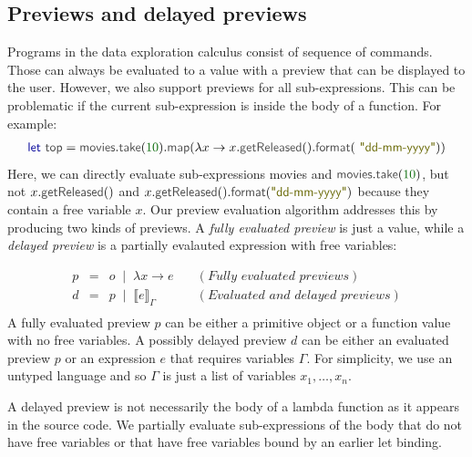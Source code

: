 \documentclass[acmsmall,anonymous,fleqn]{acmart}\settopmatter{printfolios=false,printccs=false,printacmref=false}
\theoremstyle{plain}
\theoremstyle{definition}
\newcommand{\lsep}{\;\;|\;\;}
\newcommand{\num}[1]{\textcolor{numclr}{#1}}
\newcommand{\str}[1]{\textnormal{\textcolor{strclr}{\sffamily "#1"}}}
\newcommand{\ident}[1]{\textnormal{\textcolor{idclr}{\sffamily #1}}}
\newcommand{\kvd}[1]{\textnormal{\textcolor{kvdclr}{\sffamily #1}}}
\begin{document}

\subsection{Previews and delayed previews}

Programs in the data exploration calculus consist of sequence of commands. Those can always be
evaluated to a value with a preview that can be displayed to the user. However, we also support
previews for all sub-expressions. This can be problematic if the current sub-expression is inside
the body of a function. For example:
%
\begin{equation*}
\begin{array}{l}
\kvd{let}~\ident{top} = \ident{movies}.\ident{take}(\num{10}).\ident{map}(\lambda x \rightarrow x.\ident{getReleased}().\ident{format}(\str{dd-mm-yyyy}))
\end{array}
\end{equation*}
%
Here, we can directly evaluate sub-expressions \ident{movies} and $\ident{movies}.\ident{take}(\num{10})$,
but not $x.\ident{getReleased}()$ and $x.\ident{getReleased}().\ident{format}(\str{dd-mm-yyyy})$
because they contain a free variable $x$. Our preview evaluation algorithm addresses this by
producing two kinds of previews. A \emph{fully evaluated preview} is just a value, while
a \emph{delayed preview} is a partially evalauted expression with free variables:

\begin{equation*}
\begin{array}{rcll}
p&=&o \lsep  \lambda x\rightarrow e&\quad(\textit{Fully evaluated previews})\\
d&=&p \lsep  \llbracket e \rrbracket_\Gamma&\quad(\textit{Evaluated and delayed previews})\\
\end{array}
\end{equation*}
%
A fully evaluated preview $p$ can be either a primitive object or a function value with no free
variables. A possibly delayed preview $d$ can be either an evaluated preview $p$ or an expression
$e$ that requires variables $\Gamma$. For simplicity, we use an untyped language and so $\Gamma$
is just a list of variables $x_1, \ldots, x_n$.

A delayed preview is not necessarily the body of a lambda function as it appears in the source
code. We partially evaluate sub-expressions of the body that do not have free variables or that
have free variables bound by an earlier let binding.
\end{document}
